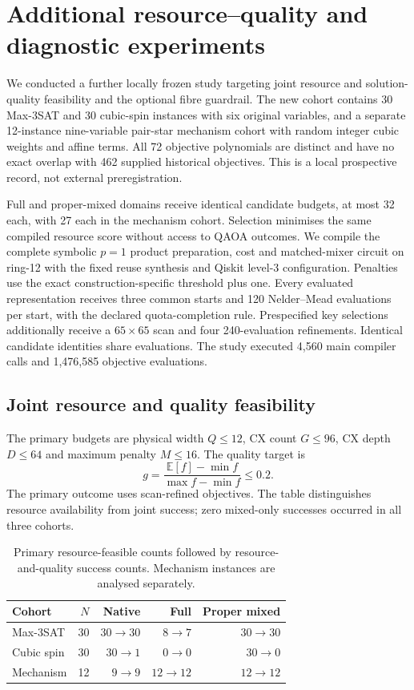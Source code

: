 \section{Additional resource--quality and diagnostic experiments}
\label{sec:feedback-iteration-v3}

We conducted a further locally frozen study targeting joint resource and
solution-quality feasibility and the optional fibre guardrail. The new cohort
contains 30 Max-3SAT and 30 cubic-spin instances with six original variables,
and a separate 12-instance nine-variable pair-star mechanism cohort with
random integer cubic weights and affine terms. All 72 objective polynomials
are distinct and have no exact overlap with 462 supplied historical objectives.
This is a local prospective record, not external preregistration.

Full and proper-mixed domains receive identical candidate budgets, at most
32 each, with 27 each in the mechanism cohort. Selection minimises the same
compiled resource score without access to QAOA outcomes. We compile the
complete symbolic $p=1$ product preparation, cost and matched-mixer circuit on
ring-12 with the fixed reuse synthesis and Qiskit level-3 configuration.
Penalties use the exact construction-specific threshold plus one.
Every evaluated representation receives three common starts and 120
Nelder--Mead evaluations per start, with the declared quota-completion rule.
Prespecified key selections additionally receive a $65\times65$ scan and
four 240-evaluation refinements. Identical candidate identities share evaluations.
The study executed 4,560 main compiler calls and 1,476,585 objective evaluations.

\subsection{Joint resource and quality feasibility}
The primary budgets are physical width $Q\leq12$, CX count $G\leq96$,
CX depth $D\leq64$ and maximum penalty $M\leq16$. The quality target is
\[
 g=\frac{\mathbb E[f]-\min f}{\max f-\min f}\leq0.2.
\]
The primary outcome uses scan-refined objectives. The table distinguishes
resource availability from joint success; zero mixed-only successes occurred
in all three cohorts.
\begin{table}[htbp]\centering\small
\caption{Primary resource-feasible counts followed by resource-and-quality
success counts. Mechanism instances are analysed separately.}
\begin{tabular}{lrrrr}\toprule
Cohort & $N$ & Native & Full & Proper mixed\\\midrule
Max-3SAT & 30 & $30\to30$ & $8\to7$ & $30\to30$\\
Cubic spin & 30 & $30\to1$ & $0\to0$ & $30\to0$\\
Mechanism & 12 & $9\to9$ & $12\to12$ & $12\to12$\\\bottomrule
\end{tabular}
\end{table}

